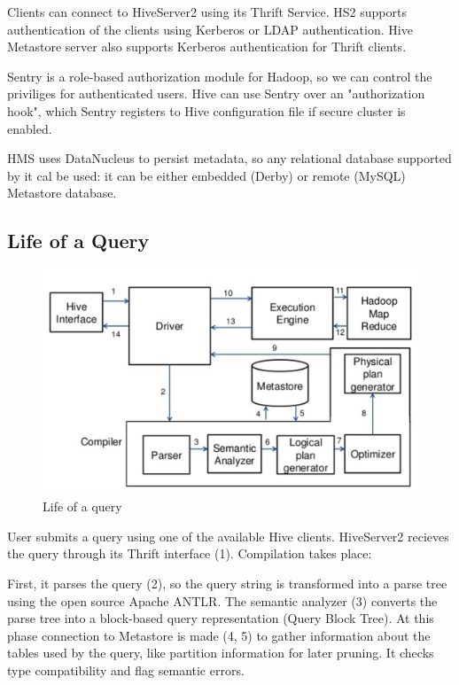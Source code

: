 Clients can connect to HiveServer2 using its Thrift Service. HS2 supports authentication of the clients using Kerberos or LDAP authentication. Hive Metastore server also supports Kerberos authentication for Thrift clients.

Sentry is a role-based authorization module for Hadoop, so we can control the priviliges for authenticated users. Hive can use Sentry over an "authorization hook", which Sentry registers to Hive configuration file if secure cluster is enabled. 

HMS uses DataNucleus to persist metadata, so any relational database supported by it cal be used: it can be either embedded (\eg Derby) or remote (\eg MySQL) Metastore database.

\subsection{Life of a Query}
\begin{figure}[H]
	\includegraphics[width=150mm, keepaspectratio]{figures/hive-query.png}
	\centering
	\caption*{Life of a query  \cite{Hive-query-figure}}
\end{figure}
User submits a query using one of the available Hive clients. HiveServer2 recieves the query through its Thrift interface (1). Compilation takes place: 

First, it parses the query (2), so the query string is transformed into a parse tree using the open source Apache ANTLR.  The semantic analyzer (3) converts the parse tree into a block-based query representation (Query Block Tree). At this phase connection to Metastore is made (4, 5) to gather information about the tables used by the query, like partition information for later pruning. It checks type compatibility and flag semantic errors. 

